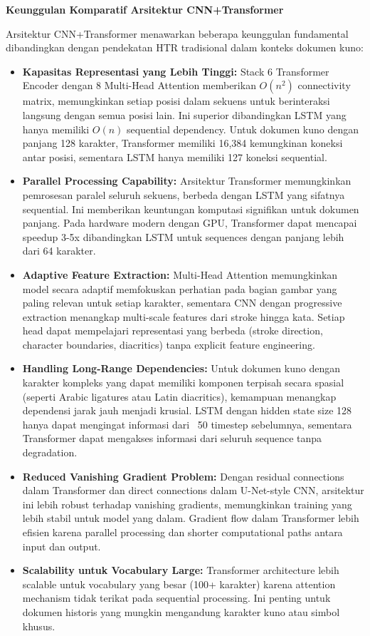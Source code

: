 \documentclass[12pt,a4paper]{article}
\begin{document}
\textbf{Keunggulan Komparatif Arsitektur CNN+Transformer}

Arsitektur CNN+Transformer menawarkan beberapa keunggulan fundamental dibandingkan dengan pendekatan HTR tradisional dalam konteks dokumen kuno:

\begin{itemize}
    \item \textbf{Kapasitas Representasi yang Lebih Tinggi:} Stack 6 Transformer Encoder dengan 8 Multi-Head Attention memberikan $O(n^2)$ connectivity matrix, memungkinkan setiap posisi dalam sekuens untuk berinteraksi langsung dengan semua posisi lain. Ini superior dibandingkan LSTM yang hanya memiliki $O(n)$ sequential dependency. Untuk dokumen kuno dengan panjang 128 karakter, Transformer memiliki 16,384 kemungkinan koneksi antar posisi, sementara LSTM hanya memiliki 127 koneksi sequential.

    \item \textbf{Parallel Processing Capability:} Arsitektur Transformer memungkinkan pemrosesan paralel seluruh sekuens, berbeda dengan LSTM yang sifatnya sequential. Ini memberikan keuntungan komputasi signifikan untuk dokumen panjang. Pada hardware modern dengan GPU, Transformer dapat mencapai speedup 3-5x dibandingkan LSTM untuk sequences dengan panjang lebih dari 64 karakter.

    \item \textbf{Adaptive Feature Extraction:} Multi-Head Attention memungkinkan model secara adaptif memfokuskan perhatian pada bagian gambar yang paling relevan untuk setiap karakter, sementara CNN dengan progressive extraction menangkap multi-scale features dari stroke hingga kata. Setiap head dapat mempelajari representasi yang berbeda (stroke direction, character boundaries, diacritics) tanpa explicit feature engineering.

    \item \textbf{Handling Long-Range Dependencies:} Untuk dokumen kuno dengan karakter kompleks yang dapat memiliki komponen terpisah secara spasial (seperti Arabic ligatures atau Latin diacritics), kemampuan menangkap dependensi jarak jauh menjadi krusial. LSTM dengan hidden state size 128 hanya dapat mengingat informasi dari ~50 timestep sebelumnya, sementara Transformer dapat mengakses informasi dari seluruh sequence tanpa degradation.

    \item \textbf{Reduced Vanishing Gradient Problem:} Dengan residual connections dalam Transformer dan direct connections dalam U-Net-style CNN, arsitektur ini lebih robust terhadap vanishing gradients, memungkinkan training yang lebih stabil untuk model yang dalam. Gradient flow dalam Transformer lebih efisien karena parallel processing dan shorter computational paths antara input dan output.

    \item \textbf{Scalability untuk Vocabulary Large:} Transformer architecture lebih scalable untuk vocabulary yang besar (100+ karakter) karena attention mechanism tidak terikat pada sequential processing. Ini penting untuk dokumen historis yang mungkin mengandung karakter kuno atau simbol khusus.
\end{itemize}
\end{document}
